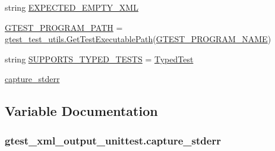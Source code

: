 \begin{DoxyCompactItemize}
string \hyperlink{namespacegtest__xml__output__unittest_abe1569d019b037f006986004349c7cf3}{E\+X\+P\+E\+C\+T\+E\+D\+\_\+\+E\+M\+P\+T\+Y\+\_\+\+X\+ML}
\item 
\hyperlink{namespacegtest__xml__output__unittest_a8c4cf6e9b6a184278a1b2759e5eaec6b}{G\+T\+E\+S\+T\+\_\+\+P\+R\+O\+G\+R\+A\+M\+\_\+\+P\+A\+TH} = \hyperlink{namespacegtest__test__utils_a89ed3717984a80ffbb7a9c92f71b86a2}{gtest\+\_\+test\+\_\+utils.\+Get\+Test\+Executable\+Path}(\hyperlink{namespacegtest__xml__output__unittest_ab89cc5b402310ef67bcaf38fa5017461}{G\+T\+E\+S\+T\+\_\+\+P\+R\+O\+G\+R\+A\+M\+\_\+\+N\+A\+ME})
\item 
string \hyperlink{namespacegtest__xml__output__unittest_a07eecd027d660022c0ab447f3c3e0f2e}{S\+U\+P\+P\+O\+R\+T\+S\+\_\+\+T\+Y\+P\+E\+D\+\_\+\+T\+E\+S\+TS} = \textquotesingle{}\hyperlink{classTypedTest}{Typed\+Test}\textquotesingle{}
\item 
\hyperlink{namespacegtest__xml__output__unittest_a143c9ca62f439947dde9eb76bfe243e3}{capture\+\_\+stderr}
\end{DoxyCompactItemize}


\subsection{Variable Documentation}
\subsubsection[{\texorpdfstring{capture\+\_\+stderr}{capture_stderr}}]{\setlength{\rightskip}{0pt plus 5cm}gtest\+\_\+xml\+\_\+output\+\_\+unittest.\+capture\+\_\+stderr}\hypertarget{namespacegtest__xml__output__unittest_a143c9ca62f439947dde9eb76bfe243e3}{}\label{namespacegtest__xml__output__unittest_a143c9ca62f439947dde9eb76bfe243e3}
